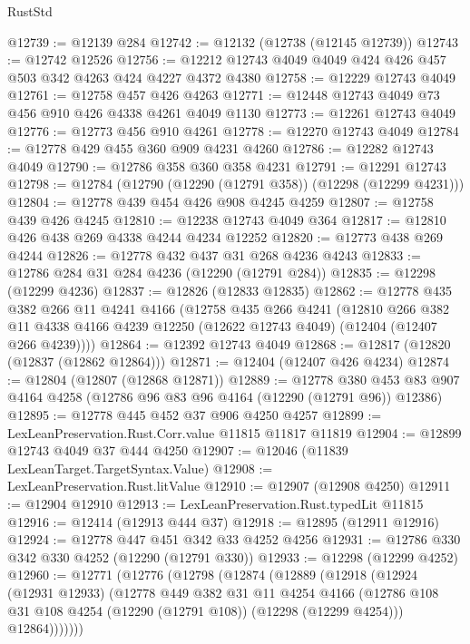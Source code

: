 \begin{lexlean}{RustStd}
\begin{coremodule}
{\begin{coremodule}
{{{{{{{{{{{{{{{{{{{{{{{{{{{{{{{{{{{{{{{{{{{{{{{{{{@12739 := @12139 @284
@12742 := @12132 (@12738 (@12145 @12739))
@12743 := @12742 @12526
@12756 := @12212 @12743 @4049 @4049 @424 @426 @457 @503 @342 @4263 @424 @4227 @4372 @4380
@12758 := @12229 @12743 @4049
@12761 := @12758 @457 @426 @4263
@12771 := @12448 @12743 @4049 @73 @456 @910 @426 @4338 @4261 @4049 @1130
@12773 := @12261 @12743 @4049
@12776 := @12773 @456 @910 @4261
@12778 := @12270 @12743 @4049
@12784 := @12778 @429 @455 @360 @909 @4231 @4260
@12786 := @12282 @12743 @4049
@12790 := @12786 @358 @360 @358 @4231
@12791 := @12291 @12743
@12798 := @12784 (@12790 (@12290 (@12791 @358)) (@12298 (@12299 @4231)))
@12804 := @12778 @439 @454 @426 @908 @4245 @4259
@12807 := @12758 @439 @426 @4245
@12810 := @12238 @12743 @4049 @364
@12817 := @12810 @426 @438 @269 @4338 @4244 @4234 @12252
@12820 := @12773 @438 @269 @4244
@12826 := @12778 @432 @437 @31 @268 @4236 @4243
@12833 := @12786 @284 @31 @284 @4236 (@12290 (@12791 @284))
@12835 := @12298 (@12299 @4236)
@12837 := @12826 (@12833 @12835)
@12862 := @12778
    @435
    @382
    @266
    @11
    @4241
    @4166
    (@12758
      @435
      @266
      @4241
      (@12810
        @266
        @382
        @11
        @4338
        @4166
        @4239
        @12250
        (@12622 @12743 @4049)
        (@12404 (@12407 @266 @4239))))
@12864 := @12392 @12743 @4049
@12868 := @12817 (@12820 (@12837 (@12862 @12864)))
@12871 := @12404 (@12407 @426 @4234)
@12874 := @12804 (@12807 (@12868 @12871))
@12889 := @12778
    @380
    @453
    @83
    @907
    @4164
    @4258
    (@12786 @96 @83 @96 @4164 (@12290 (@12791 @96)) @12386)
@12895 := @12778 @445 @452 @37 @906 @4250 @4257
@12899 := LexLeanPreservation.Rust.Corr.value @11815 @11817 @11819
@12904 := @12899 @12743 @4049 @37 @444 @4250
@12907 := @12046 (@11839 LexLeanTarget.TargetSyntax.Value)
@12908 := LexLeanPreservation.Rust.litValue
@12910 := @12907 (@12908 @4250)
@12911 := @12904 @12910
@12913 := LexLeanPreservation.Rust.typedLit @11815
@12916 := @12414 (@12913 @444 @37)
@12918 := @12895 (@12911 @12916)
@12924 := @12778 @447 @451 @342 @33 @4252 @4256
@12931 := @12786 @330 @342 @330 @4252 (@12290 (@12791 @330))
@12933 := @12298 (@12299 @4252)
@12960 := @12771
    (@12776
      (@12798
        (@12874
          (@12889
            (@12918
              (@12924
                (@12931 @12933)
                (@12778
                  @449
                  @382
                  @31
                  @11
                  @4254
                  @4166
                  (@12786 @108 @31 @108 @4254 (@12290 (@12791 @108)) (@12298 (@12299 @4254)))
                  @12864)))))))
}}}}}}}}}}}}}}}}}}}}}}}}}}}}}}}}}}}}}}}}}}}}}}}}}}
\end{coremodule}}
\end{coremodule}
\end{lexlean}
